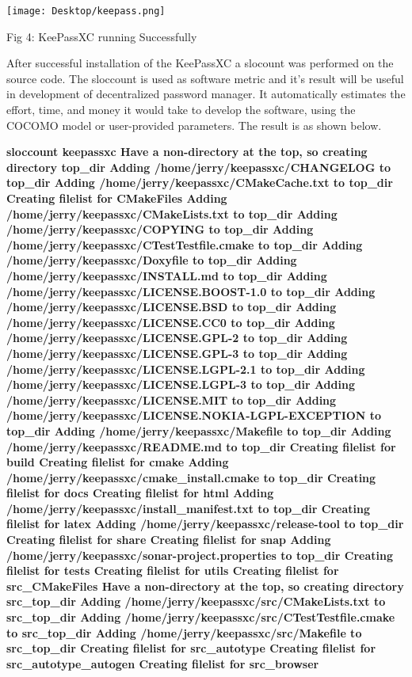\documentclass[12pt]{article}
\begin{document}
\texttt{[image: Desktop/keepass.png]} 
\caption{Fig 4: KeePassXC running Successfully}
\bigskip

After successful installation of the KeePassXC a slocount was performed on the source code. The sloccount is used as software metric and it’s result will be useful in development of decentralized password manager.  It automatically estimates the effort, time, and money it would take to develop the software, using the COCOMO model or user-provided parameters.  The result is as shown below.

\bigskip

\textbf{sloccount keepassxc
Have a non-directory at the top, so creating directory top_dir
Adding /home/jerry/keepassxc/CHANGELOG to top_dir
Adding /home/jerry/keepassxc/CMakeCache.txt to top_dir
Creating filelist for CMakeFiles
Adding /home/jerry/keepassxc/CMakeLists.txt to top_dir
Adding /home/jerry/keepassxc/COPYING to top_dir
Adding /home/jerry/keepassxc/CTestTestfile.cmake to top_dir
Adding /home/jerry/keepassxc/Doxyfile to top_dir
Adding /home/jerry/keepassxc/INSTALL.md to top_dir
Adding /home/jerry/keepassxc/LICENSE.BOOST-1.0 to top_dir
Adding /home/jerry/keepassxc/LICENSE.BSD to top_dir
Adding /home/jerry/keepassxc/LICENSE.CC0 to top_dir
Adding /home/jerry/keepassxc/LICENSE.GPL-2 to top_dir
Adding /home/jerry/keepassxc/LICENSE.GPL-3 to top_dir
Adding /home/jerry/keepassxc/LICENSE.LGPL-2.1 to top_dir
Adding /home/jerry/keepassxc/LICENSE.LGPL-3 to top_dir
Adding /home/jerry/keepassxc/LICENSE.MIT to top_dir
Adding /home/jerry/keepassxc/LICENSE.NOKIA-LGPL-EXCEPTION to top_dir
Adding /home/jerry/keepassxc/Makefile to top_dir
Adding /home/jerry/keepassxc/README.md to top_dir
Creating filelist for build
Creating filelist for cmake
Adding /home/jerry/keepassxc/cmake_install.cmake to top_dir
Creating filelist for docs
Creating filelist for html
Adding /home/jerry/keepassxc/install_manifest.txt to top_dir
Creating filelist for latex
Adding /home/jerry/keepassxc/release-tool to top_dir
Creating filelist for share
Creating filelist for snap
Adding /home/jerry/keepassxc/sonar-project.properties to top_dir
Creating filelist for tests
Creating filelist for utils
Creating filelist for src_CMakeFiles
Have a non-directory at the top, so creating directory src_top_dir
Adding /home/jerry/keepassxc/src/CMakeLists.txt to src_top_dir
Adding /home/jerry/keepassxc/src/CTestTestfile.cmake to src_top_dir
Adding /home/jerry/keepassxc/src/Makefile to src_top_dir
Creating filelist for src_autotype
Creating filelist for src_autotype_autogen
Creating filelist for src_browser
}
\end{document}
